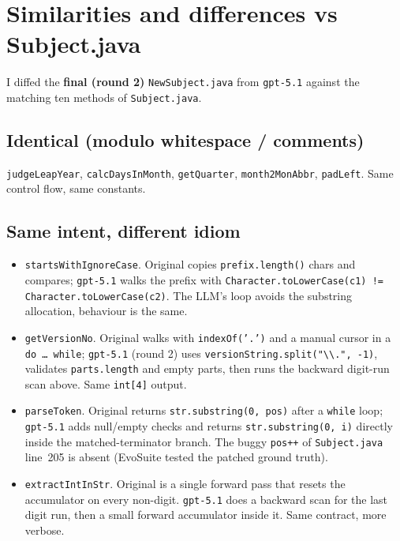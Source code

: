 \documentclass[manuscript,review,nonacm]{acmart}
\begin{document}
\section{Similarities and differences vs Subject.java}

I diffed the \textbf{final (round 2)} \texttt{NewSubject.java} from
\texttt{gpt-5.1} against the matching ten methods of
\texttt{Subject.java}.

\subsection{Identical (modulo whitespace / comments)}
\texttt{judgeLeapYear}, \texttt{calcDaysInMonth},
\texttt{getQuarter}, \texttt{month2MonAbbr}, \texttt{padLeft}. Same
control flow, same constants.

\subsection{Same intent, different idiom}
\begin{itemize}\itemsep1pt
\item \texttt{startsWithIgnoreCase}. Original copies
      \texttt{prefix.length()} chars and compares;
      \texttt{gpt-5.1} walks the prefix with
      \texttt{Character.toLowerCase(c1) != Character.toLowerCase(c2)}.
      The LLM's loop avoids the substring allocation, behaviour is the
      same.
\item \texttt{getVersionNo}. Original walks with
      \texttt{indexOf('.')} and a manual cursor in a
      \texttt{do\,\dots\,while}; \texttt{gpt-5.1} (round 2) uses
      \texttt{versionString.split("\textbackslash{}\textbackslash{}.", -1)},
      validates \texttt{parts.length} and empty parts, then runs the
      backward digit-run scan above. Same \texttt{int[4]} output.
\item \texttt{parseToken}. Original returns
      \texttt{str.substring(0, pos)} after a \texttt{while} loop;
      \texttt{gpt-5.1} adds null/empty checks and returns
      \texttt{str.substring(0, i)} directly inside the
      matched-terminator branch. The buggy \texttt{pos++} of
      \texttt{Subject.java} line~205 is absent (EvoSuite tested the
      patched ground truth).
\item \texttt{extractIntInStr}. Original is a single forward pass
      that resets the accumulator on every non-digit.
      \texttt{gpt-5.1} does a backward scan for the last digit run,
      then a small forward accumulator inside it. Same contract, more
      verbose.
\end{itemize}
\end{document}
